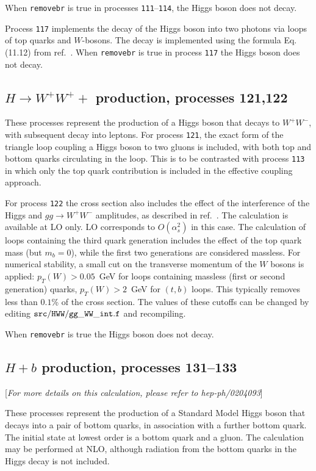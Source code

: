 \documentclass[12pt]{article}
\begin{document}
When {\tt removebr} is true in processes {\tt 111}--{\tt 114},
the Higgs boson does not decay.

Process {\tt 117} implements the decay of the Higgs boson into two photons
via loops of top quarks and $W$-bosons.
The decay is implemented using the formula Eq.(11.12) from ref.~\cite{Ellis:1991qj}.
When {\tt removebr} is true in process {\tt 117} the Higgs boson does not decay.

\subsection{$H \to W^+W^++$ production, processes 121,122}
These processes represent the production of a Higgs boson that decays to $W^+ W^-$,
with subsequent decay into leptons. For process {\tt 121}, the exact form of the triangle
loop coupling a Higgs boson to two gluons is included, with both top and bottom quarks
circulating in the loop. This is to be contrasted with process {\tt 113} in which only the
top quark contribution is included in the effective coupling approach.

For process {\tt 122} the cross section also includes the effect of the interference of the
Higgs and $gg \to W^+W^-$ amplitudes, as described in ref.~\cite{Campbell:2011cu}.
The calculation is available at LO only. LO corresponds to $O(\alpha_s^2)$ in this case.
The calculation of loops containing the third quark generation
includes the effect of the top quark mass (but $m_b=0$), while the first two
generations are considered massless. For numerical stability, a small cut on the
transverse momentum of the $W$ bosons is applied: $p_T(W)>0.05$~GeV for loops
containing massless (first or second generation) quarks, $p_T(W)>2$~GeV for $(t,b)$
loops. This typically removes less than $0.1$\% of the cross section. The
values of these cutoffs can be changed by editing ${\tt src/HWW/gg\_WW\_int.f}$ and recompiling.


When {\tt removebr} is true the Higgs boson does not decay.

\subsection{$H+b$ production, processes 131--133}
\label{subsec:Hb}

\begin{center}
[{\it For more details on this calculation, please refer to hep-ph/0204093}]
\end{center}

These processes represent the production of a Standard Model Higgs
boson that decays into a pair of bottom quarks,
in association with a further bottom quark. The initial state at lowest order
is a bottom quark and a gluon.
The calculation may be performed at NLO, although radiation from the
bottom quarks in the Higgs decay is not included.
\end{document}
